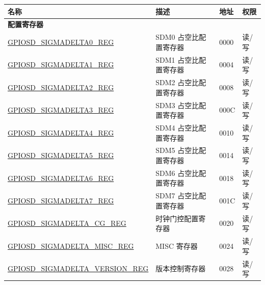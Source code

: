 \begin{longtable}{ | p{6cm} | p{7.2cm} | p{1.3cm} | p{1cm} | }
\hline\rowcolor{lightgray}
名称 & 描述 &  地址 & 权限 \\ \hline
\endhead
\multicolumn{4}{|l|}{\textbf{配置寄存器}} \\ \hline
\hyperref[regdesc:GPIOSDSIGMADELTANREG]{GPIOSD\_SIGMADELTA0\_REG} & SDM0 占空比配置寄存器 & \hexprefix{}0000 & 读/写 \\ \hline
\hyperref[regdesc:GPIOSDSIGMADELTANREG]{GPIOSD\_SIGMADELTA1\_REG} & SDM1 占空比配置寄存器 & \hexprefix{}0004 & 读/写 \\ \hline
\hyperref[regdesc:GPIOSDSIGMADELTANREG]{GPIOSD\_SIGMADELTA2\_REG} & SDM2 占空比配置寄存器 & \hexprefix{}0008 & 读/写 \\ \hline
\hyperref[regdesc:GPIOSDSIGMADELTANREG]{GPIOSD\_SIGMADELTA3\_REG} & SDM3 占空比配置寄存器 & \hexprefix{}000C & 读/写 \\ \hline
\hyperref[regdesc:GPIOSDSIGMADELTANREG]{GPIOSD\_SIGMADELTA4\_REG} & SDM4 占空比配置寄存器 & \hexprefix{}0010 & 读/写 \\ \hline
\hyperref[regdesc:GPIOSDSIGMADELTANREG]{GPIOSD\_SIGMADELTA5\_REG} & SDM5 占空比配置寄存器 & \hexprefix{}0014 & 读/写 \\ \hline
\hyperref[regdesc:GPIOSDSIGMADELTANREG]{GPIOSD\_SIGMADELTA6\_REG} & SDM6 占空比配置寄存器 & \hexprefix{}0018 & 读/写 \\ \hline
\hyperref[regdesc:GPIOSDSIGMADELTANREG]{GPIOSD\_SIGMADELTA7\_REG} & SDM7 占空比配置寄存器 & \hexprefix{}001C & 读/写 \\ \hline
\hyperref[regdesc:GPIOSDSIGMADELTACGREG]{GPIOSD\_SIGMADELTA\_CG\_REG} & 时钟门控配置寄存器 & \hexprefix{}0020 & 读/写 \\ \hline
\hyperref[regdesc:GPIOSDSIGMADELTAMISCREG]{GPIOSD\_SIGMADELTA\_MISC\_REG} & MISC 寄存器 & \hexprefix{}0024 & 读/写 \\ \hline
\hyperref[regdesc:GPIOSDSIGMADELTAVERSIONREG]{GPIOSD\_SIGMADELTA\_VERSION\_REG} & 版本控制寄存器 & \hexprefix{}0028 & 读/写 \\ \hline
\end{longtable}
